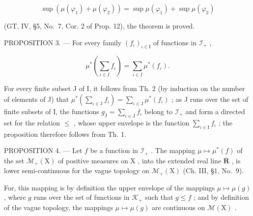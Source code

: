 \[
\sup \left(\mu (\varphi_ {1}) + \mu (\varphi_ {2})\right) = \sup \mu (\varphi_ {1}) + \sup \mu (\varphi_ {2})
\]

(GT, IV, §5, No.~7, Cor. 2 of Prop. 12), the theorem is proved.

PROPOSITION 3. --- For every family \((f_{\iota})_{\iota \in \mathrm{I}}\) of functions in \(\mathcal{I}_{+}\) ,

\[
\mu^ {*} \left(\sum_ {\iota \in I} f _ {\iota}\right) = \sum_ {\iota \in I} \mu^ {*} (f _ {\iota}).\tag{4}
\]

For every finite subset J of I, it follows from Th. 2 (by induction on the number of elements of J) that \(\mu^{*}\left(\sum_{\iota \in \mathrm{J}}f_{\iota}\right) = \sum_{\iota \in \mathrm{J}}\mu^{*}(f_{\iota})\) ; as J runs over the set of finite subsets of I, the functions \(g_{\mathrm{J}} = \sum_{\iota \in \mathrm{J}}f_{\iota}\) belong to \(\mathcal{I}_{+}\) and form a directed set for the relation \(\leqslant\) , whose upper envelope is the function \(\sum_{\iota \in \mathrm{I}}f_{\iota}\) ; the proposition therefore follows from Th. 1.

PROPOSITION 4. --- Let \(f\) be a function in \(\mathcal{I}_{+}\) . The mapping \(\mu \mapsto \mu^{*}(f)\) of the set \(\mathcal{M}_{+}(\mathrm{X})\) of positive measures on \(\mathrm{X}\) , into the extended real line \(\overline{\mathbf{R}}\) , is lower semi-continuous for the vague topology on \(\mathcal{M}_{+}(\mathrm{X})\) (Ch. III, §1, No.~9).

For, this mapping is by definition the upper envelope of the mappings \(\mu \mapsto \mu(g)\) , where \(g\) runs over the set of functions in \(\mathcal{K}_{+}\) such that \(g \leqslant f\) ; and by definition of the vague topology, the mappings \(\mu \mapsto \mu(g)\) are continuous on \(\mathcal{M}(\mathrm{X})\) .

